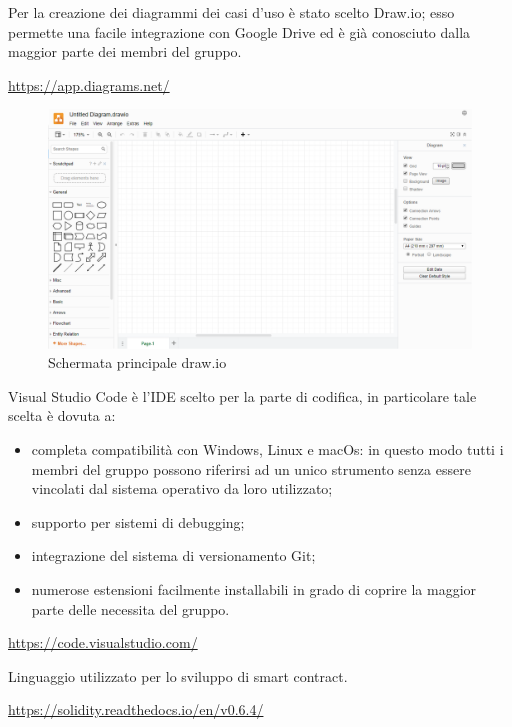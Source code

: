 	Per la creazione dei diagrammi dei casi d'uso è stato scelto Draw.io; esso permette  una facile integrazione con Google Drive ed è già conosciuto dalla maggior parte dei membri del gruppo. 
	\begin{center}
		\url{https://app.diagrams.net/}
	\end{center}
	\begin{figure}[h!]
		\centering
		\includegraphics[scale=0.62]{./res/img/draw.png}
		\caption{Schermata principale draw.io}
	\end{figure}
	
	Visual Studio Code è l'IDE scelto per la parte di codifica, in particolare tale scelta è dovuta a: 
	\begin{itemize}
		\item completa compatibilità con Windows, Linux e macOs: in questo modo tutti i membri del gruppo possono riferirsi ad un unico strumento senza essere vincolati dal sistema operativo da loro utilizzato; 
		\item supporto per sistemi di debugging; 
		\item integrazione del sistema di versionamento Git; 
		\item numerose estensioni facilmente installabili in grado di coprire la maggior parte delle necessita del gruppo. 
	\end{itemize} 
	\begin{center}
		\url{https://code.visualstudio.com/}
	\end{center}

	Linguaggio utilizzato per lo sviluppo di smart contract.
	\begin{center}
		\url{https://solidity.readthedocs.io/en/v0.6.4/}
	\end{center}

